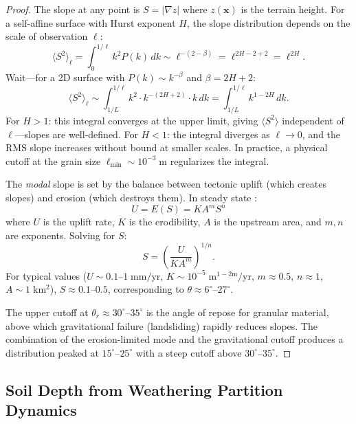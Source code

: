 \documentclass[10pt,twocolumn]{article}
\theoremstyle{definition}
\theoremstyle{remark}
\begin{document}
\begin{proof}
The slope at any point is $S = |\nabla z|$ where $z(\mathbf{x})$
is the terrain height.  For a self-affine surface with Hurst
exponent $H$, the slope distribution depends on the scale of
observation $\ell$:
\begin{equation}
  \langle S^2\rangle_\ell
  = \int_0^{1/\ell} k^2 P(k)\,dk
  \sim \ell^{-(2-\beta)}
  = \ell^{2H-2+2}
  = \ell^{2H}.
\end{equation}
Wait---for a 2D surface with $P(k)\sim k^{-\beta}$ and
$\beta = 2H+2$:
\begin{equation}
  \langle S^2\rangle_\ell
  \sim \int_{1/L}^{1/\ell} k^2\cdot k^{-(2H+2)}\cdot k\,dk
  = \int_{1/L}^{1/\ell} k^{1-2H}\,dk.
\end{equation}
For $H>1$: this integral converges at the upper limit,
giving $\langle S^2\rangle$ independent of $\ell$---slopes
are well-defined.  For $H<1$: the integral diverges as
$\ell\to 0$, and the RMS slope increases without bound at
smaller scales.  In practice, a physical cutoff at the grain
size $\ell_{\min}\sim 10^{-3}\;\mathrm{m}$ regularizes the
integral.

The \emph{modal} slope is set by the balance between tectonic
uplift (which creates slopes) and erosion (which destroys
them).  In steady state \citep{Dietrich2003}:
\begin{equation}
  U = E(S) = K A^m S^n
\end{equation}
where $U$ is the uplift rate, $K$ is the erodibility, $A$ is
the upstream area, and $m,n$ are exponents.  Solving for $S$:
\begin{equation}
  S = \left(\frac{U}{K A^m}\right)^{1/n}.
\end{equation}
For typical values ($U\sim 0.1$--$1\;\mathrm{mm/yr}$,
$K\sim 10^{-5}\;\mathrm{m^{1-2m}/yr}$, $m\approx 0.5$,
$n\approx 1$, $A\sim 1\;\mathrm{km^2}$), $S\approx 0.1$--$0.5$,
corresponding to $\theta\approx 6^\circ$--$27^\circ$.

The upper cutoff at $\theta_r\approx 30^\circ$--$35^\circ$ is
the angle of repose for granular material, above which
gravitational failure (landsliding) rapidly reduces slopes.
The combination of the erosion-limited mode and the
gravitational cutoff produces a distribution peaked at
$15^\circ$--$25^\circ$ with a steep cutoff above
$30^\circ$--$35^\circ$.
\end{proof}

\subsection{Soil Depth from Weathering Partition Dynamics}
\label{sec:soil}
\end{document}
